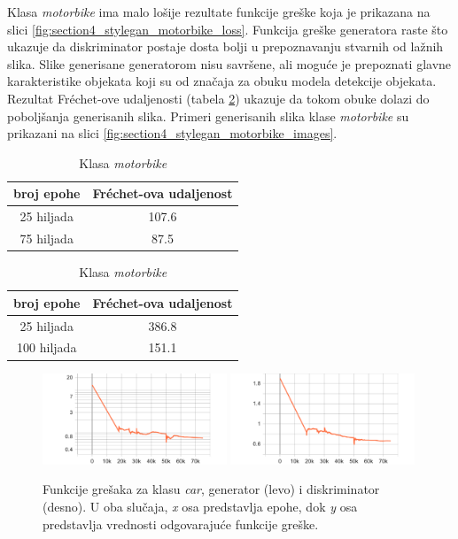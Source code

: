 \documentclass[12pt,oneside]{memoir}
\begin{document}
Klasa \textit{motorbike} ima malo lošije rezultate funkcije greške koja je prikazana na slici \ref{fig:section4_stylegan_motorbike_loss}. Funkcija greške generatora raste što ukazuje da diskriminator postaje dosta bolji u prepoznavanju stvarnih od lažnih slika. Slike generisane generatorom nisu savršene, ali moguće je prepoznati glavne karakteristike objekata koji su od značaja za obuku modela detekcije objekata. Rezultat Fréchet-ove udaljenosti (tabela \ref{tab:section4_fid_m}) ukazuje da tokom obuke dolazi do poboljšanja generisanih slika. Primeri generisanih slika klase \textit{motorbike} su prikazani na slici \ref{fig:section4_stylegan_motorbike_images}.

\begin{table}[!htb]
    \begin{minipage}{.5\linewidth}
      \caption{Klasa \textit{car}}\label{tab:section4_fid_c}
      \centering
        \begin{tabular}{c|c}
        broj epohe &  Fréchet-ova udaljenost \\
        \hline
        25 hiljada & 107.6 \\
        \hline
        75 hiljada & 87.5 \\
        \end{tabular}
    \end{minipage}%
    \begin{minipage}{.5\linewidth}
      \centering
        \caption{Klasa \textit{motorbike}}\label{tab:section4_fid_m}
        \begin{tabular}{c|c}
        broj epohe &  Fréchet-ova udaljenost \\
        \hline
        25 hiljada & 386.8 \\
        \hline
        100 hiljada & 151.1 \\
        \end{tabular}
    \end{minipage} 
\end{table}


\begin{figure}[!htbp]
\centering
  \includegraphics[width=0.49\textwidth]{matfmaster/stylegan/car/g_loss.png}
  \includegraphics[width=0.49\textwidth]{matfmaster/stylegan/car/d_loss.png}
\caption{Funkcije grešaka za klasu \textit{car}, generator (levo) i diskriminator (desno). U oba slučaja, \textit{x} osa predstavlja epohe, dok \textit{y} osa predstavlja vrednosti odgovarajuće funkcije greške.}\label{fig:section4_stylegan_car_loss}
\end{figure}
\end{document}

